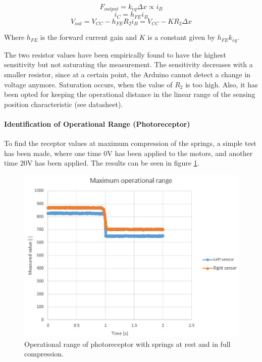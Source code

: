 \begin{equation}
F_{output} = k_{eq} \Delta x \propto i_B
\end{equation}
\begin{equation}
i_C = h_{FE} i_B
\end{equation}
\begin{equation}
V_{out} = V_{CC} - h_{FE} R_2 i_B = V_{CC} - K R_2 \Delta x
\end{equation}

Where $h_{FE}$ is the forward current gain and $K$ is a constant given by $h_{FE} k_{eq}$.
	
The two resistor values have been empirically found to have the highest sensitivity but not saturating the measurement. The sensitivity decreases with a smaller resistor, since at a certain point, the Arduino cannot detect a change in voltage anymore. Saturation occurs, when the value of $R_2$ is too high. Also, it has been opted for keeping the operational distance in the linear range of the sensing position characteristic (see datasheet).


\paragraph{Identification of Operational Range (Photoreceptor)}
To find the receptor values at maximum compression of the springs, a simple test has been made, where one time $0$V has been applied to the motors, and another time $20$V has been applied. The results can be seen in figure \ref{fig:max_volt_applied_plot}.
	
\begin{figure}[h!]
	\centering
	\includegraphics[width=0.6\linewidth]{Figs/max_volt_applied_plot}
	\caption{Operational range of photoreceptor with springs at rest and in full compression.}
	\label{fig:max_volt_applied_plot}
\end{figure}
	
